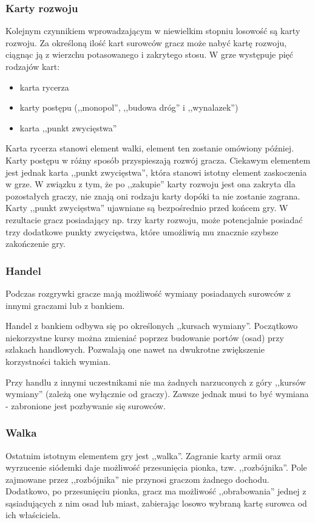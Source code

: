 \documentclass[a4paper,12pt]{article}
\begin{document}
\subsubsection{Karty rozwoju}
Kolejnym czynnikiem wprowadzającym w niewielkim stopniu losowość są
karty rozwoju. Za określoną ilość kart surowców gracz może nabyć kartę
rozwoju, ciągnąc ją z wierzchu potasowanego i zakrytego stosu. W grze
występuje pięć rodzajów kart:

\begin{itemize}
\item karta rycerza
\item karty postępu (,,monopol'', ,,budowa dróg'' i ,,wynalazek'')
\item karta ,,punkt zwycięstwa''
\end{itemize}

Karta rycerza stanowi element walki, element ten zostanie omówiony
później. Karty postępu w różny sposób przyspieszają rozwój
gracza. Ciekawym elementem jest jednak karta ,,punkt zwycięstwa'',
która stanowi istotny element zaskoczenia w grze. W związku z tym, że
po ,,zakupie'' karty rozwoju jest ona zakryta dla pozostałych graczy,
nie znają oni rodzaju karty dopóki ta nie zostanie zagrana. Karty
,,punkt zwycięstwa'' ujawniane są bezpośrednio przed końcem gry. W
rezultacie gracz posiadający np. trzy karty rozwoju, może potencjalnie
posiadać trzy dodatkowe punkty zwycięstwa, które umożliwią mu znacznie
szybsze zakończenie gry.

\subsubsection{Handel}
Podczas rozgrywki gracze mają możliwość wymiany posiadanych surowców z
innymi graczami lub z bankiem.

Handel z bankiem odbywa się po określonych ,,kursach
wymiany''. Początkowo niekorzystne kursy można zmieniać poprzez
budowanie portów (osad) przy szlakach handlowych. Pozwalają one nawet
na dwukrotne zwiększenie korzystności takich wymian.

Przy handlu z innymi uczestnikami nie ma żadnych narzuconych z góry
,,kursów wymiany'' (zależą one wyłącznie od graczy). Zawsze jednak
musi to być wymiana - zabronione jest pozbywanie się surowców.

\subsubsection{Walka}
\label{sec:fight}
Ostatnim istotnym elementem gry jest ,,walka''. Zagranie karty armii
oraz wyrzucenie siódemki daje możliwość przesunięcia pionka,
tzw. ,,rozbójnika''. Pole zajmowane przez ,,rozbójnika'' nie przynosi
graczom żadnego dochodu. Dodatkowo, po przesunięciu pionka, gracz ma
możliwość ,,obrabowania'' jednej z sąsiadujących z nim osad lub miast,
zabierając losowo wybraną kartę surowca od ich właściciela.
\end{document}
